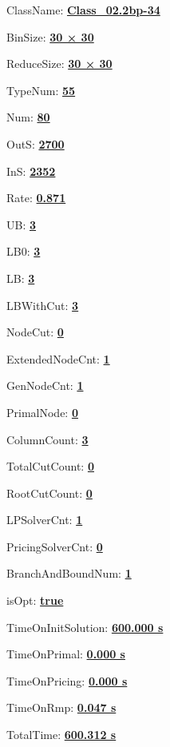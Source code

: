 \documentclass[11pt]{article}
\begin{document}
\pagestyle{empty}


ClassName: \underline{\textbf{Class_02.2bp-34}}
\par
BinSize: \underline{\textbf{30 × 30}}
\par
ReduceSize: \underline{\textbf{30 × 30}}
\par
TypeNum: \underline{\textbf{55}}
\par
Num: \underline{\textbf{80}}
\par
OutS: \underline{\textbf{2700}}
\par
InS: \underline{\textbf{2352}}
\par
Rate: \underline{\textbf{0.871}}
\par
UB: \underline{\textbf{3}}
\par
LB0: \underline{\textbf{3}}
\par
LB: \underline{\textbf{3}}
\par
LBWithCut: \underline{\textbf{3}}
\par
NodeCut: \underline{\textbf{0}}
\par
ExtendedNodeCnt: \underline{\textbf{1}}
\par
GenNodeCnt: \underline{\textbf{1}}
\par
PrimalNode: \underline{\textbf{0}}
\par
ColumnCount: \underline{\textbf{3}}
\par
TotalCutCount: \underline{\textbf{0}}
\par
RootCutCount: \underline{\textbf{0}}
\par
LPSolverCnt: \underline{\textbf{1}}
\par
PricingSolverCnt: \underline{\textbf{0}}
\par
BranchAndBoundNum: \underline{\textbf{1}}
\par
isOpt: \underline{\textbf{true}}
\par
TimeOnInitSolution: \underline{\textbf{600.000 s}}
\par
TimeOnPrimal: \underline{\textbf{0.000 s}}
\par
TimeOnPricing: \underline{\textbf{0.000 s}}
\par
TimeOnRmp: \underline{\textbf{0.047 s}}
\par
TotalTime: \underline{\textbf{600.312 s}}
\par
\newpage
\end{document}
